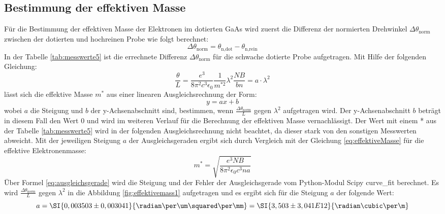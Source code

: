 \subsection{Bestimmung der effektiven Masse}
Für die Bestimmung der effektiven Masse der Elektronen im dotierten GaAs wird zuerst die Differenz der normierten Drehwinkel $\Delta\theta_\text{norm}$ zwischen der dotierten und hochreinen Probe wie folgt berechnet:
\begin{equation} 
\label{eq:differenznr}
\Delta\theta_\text{norm} = \theta_\text{n,dot} - \theta_\text{n,rein}
\end{equation}
In der Tabelle \ref{tab:messwerte5} ist die errechnete Differenz $\Delta\theta_\text{norm}$ für die schwache dotierte Probe aufgetragen. Mit Hilfe der folgenden Gleichung:
\begin{equation}
\label{eq:effektiveMasse}
\frac{\theta}{L} = \frac{e^3}{8\pi^2c^3\epsilon_0}\frac{1}{m^{*2}}\lambda^2\frac{NB}{bn} = a \cdot \lambda^2
\end{equation}
lässt sich die effektive Masse $m^*$ aus einer linearen Ausgleichsrechnung der Form:
\begin{equation}
\label{eq:ausgleichsgerade}
y = ax + b
\end{equation}
wobei $a$ die Steigung und $b$ der y-Achsenabschnitt sind, bestimmen, wenn $\frac{\Delta\theta_\text{norm}}{L}$ gegen $\lambda^2$ aufgetragen wird. Der y-Achsenabschnitt $b$ beträgt in diesem Fall den Wert $0$ und wird im weiteren Verlauf für die Berechnung der effektiven Masse vernachlässigt. Der Wert mit einem * aus der Tabelle \ref{tab:messwerte5} wird in der folgenden Ausgleichsrechnung nicht beachtet, da dieser stark von den sonstigen Messwerten abweicht. Mit der jeweiligen Steigung $a$ der Ausgleichsgeraden ergibt sich durch Vergleich mit der Gleichung \ref{eq:effektiveMasse} für die effektive Elektronenmasse:
\begin{equation}
\label{eq:eff2}
m^* = \sqrt{\frac{e^3NB}{8\pi^2\epsilon_0c^3na}}
\end{equation}
Über Formel \ref{eq:ausgleichsgerade} wird die Steigung und der Fehler der Ausgleichsgerade vom Python-Modul Scipy curve\_fit berechnet. 
Es wird $\frac{\Delta\theta_\text{norm}}{L}$ gegen $\lambda^2$ in die Abbildung \ref{fig:effektivemass1} aufgetragen und es ergibt sich für die Steigung $a$ der folgende Wert:
\begin{equation*}
a = \SI{0,003503 \pm 0,003041}{\radian\per\um\squared\per\mm} = \SI{3,503 \pm 3,041 E12}{\radian\cubic\per\m}
\end{equation*}

